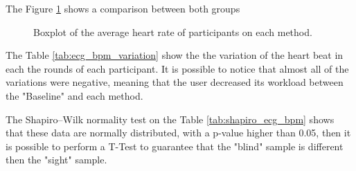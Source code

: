 The Figure \ref{fig:boxplot_ecg_bpm_scene} shows a comparison between both groups

\begin{figure}[!htb]
    \centering
    \resizebox{0.6\linewidth}{!}{
        
    }
    \caption{Boxplot of the average heart rate of participants on each method.}
    \label{fig:boxplot_ecg_bpm_scene}
\end{figure}

The Table \ref{tab:ecg_bpm_variation} show the the variation of the heart beat in each the rounds of each participant. It is possible to notice that almost all of the variations were negative, meaning that the user decreased its workload between the "Baseline" and each method.



%
%    
%
%
%
%
%    
%
The Shapiro–Wilk normality test on the Table \ref{tab:shapiro_ecg_bpm} shows that these data are normally distributed, with a p-value higher than 0.05, then it is possible to perform a T-Test to guarantee that the "blind" sample is different then the "sight" sample.

